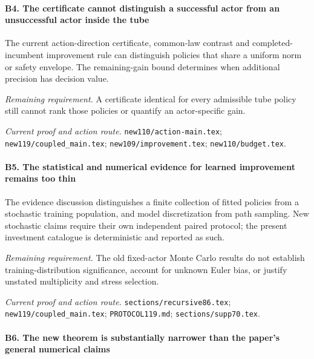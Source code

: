\paragraph{B4. The certificate cannot distinguish a successful actor from an unsuccessful actor inside the tube}

The current action-direction certificate, common-law contrast and completed-incumbent improvement rule can distinguish policies that share a uniform norm or safety envelope. The remaining-gain bound determines when additional precision has decision value.

\par\emph{Remaining requirement.} A certificate identical for every admissible tube policy still cannot rank those policies or quantify an actor-specific gain.

\par\emph{Current proof and action route.} \nolinkurl{new110/action-main.tex}; \nolinkurl{new119/coupled_main.tex}; \nolinkurl{new109/improvement.tex}; \nolinkurl{new110/budget.tex}.

\paragraph{B5. The statistical and numerical evidence for learned improvement remains too thin}

The evidence discussion distinguishes a finite collection of fitted policies from a stochastic training population, and model discretization from path sampling. New stochastic claims require their own independent paired protocol; the present investment catalogue is deterministic and reported as such.

\par\emph{Remaining requirement.} The old fixed-actor Monte Carlo results do not establish training-distribution significance, account for unknown Euler bias, or justify unstated multiplicity and stress selection.

\par\emph{Current proof and action route.} \nolinkurl{sections/recursive86.tex}; \nolinkurl{new119/coupled_main.tex}; \nolinkurl{PROTOCOL119.md}; \nolinkurl{sections/supp70.tex}.

\paragraph{B6. The new theorem is substantially narrower than the paper's general numerical claims}

